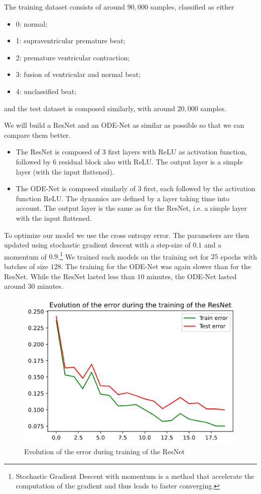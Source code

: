 \documentclass[10pt,a4paper]{article}
\theoremstyle{definition}
\theoremstyle{plain}
\begin{document}
The training dataset consists of around $90,000$ samples, classified as either 
\begin{itemize}
\item 0: normal;
\item 1: supraventricular premature beat;
\item 2: premature ventricular contraction;
\item 3: fusion of ventricular and normal beat;
\item 4: unclassified beat;
\end{itemize}
and the test dataset is composed similarly, with around $20,000$ samples.

We will build a ResNet and an ODE-Net as similar as possible so that we can compare them better.
\begin{itemize}
\item The ResNet is composed of 3 first layers with ReLU as activation function, followed by 6 residual block also with ReLU. The output layer is a simple layer (with the input flattened).

\item The ODE-Net is composed similarly of 3 first, each followed by the activation function ReLU. The dynamics are defined by a layer taking time into account. The output layer is the same as for the ResNet, i.e. a simple layer with the input flattened.
\end{itemize}

To optimize our model we use the cross entropy error. The parameters are then updated using stochastic gradient descent with a step-size of $0.1$ and a momentum of $0.9$.\footnote{Stochastic Gradient Descent with momentum is a method that accelerate the computation of the gradient and thus leads to faster converging.\cite{8}}
We trained each models on the training set for $25$ epochs with batches of size $128$. The training for the ODE-Net was again slower than for the ResNet. While the ResNet lasted less than $10$ minutes, the ODE-Net lasted around $30$ minutes.

\begin{figure}[!h]
\center
\includegraphics[scale=0.5]{resnet_rd_loss.png}
\caption{Evolution of the error during training of the ResNet}
\label{resnet_rd}
\end{figure}
\end{document}
